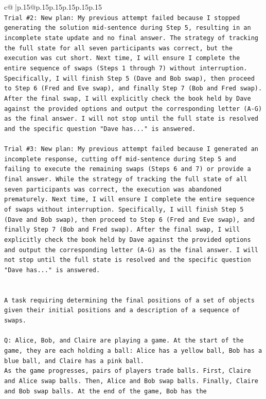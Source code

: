 \documentclass{article}
\begin{document}
{\begin{supertabular}{c@{$\;$}|p{.15\linewidth}@{}p{.15\linewidth}p{.15\linewidth}p{.15\linewidth}p{.15\linewidth}p{.15\linewidth}}
{{{\\ 
\texttt{Trial \#2: New plan: My previous attempt failed because I stopped generating the solution mid{-}sentence during Step 5, resulting in an incomplete state update and no final answer. The strategy of tracking the full state for all seven participants was correct, but the execution was cut short. Next time, I will ensure I complete the entire sequence of swaps (Steps 1 through 7) without interruption. Specifically, I will finish Step 5 (Dave and Bob swap), then proceed to Step 6 (Fred and Eve swap), and finally Step 7 (Bob and Fred swap). After the final swap, I will explicitly check the book held by Dave against the provided options and output the corresponding letter (A{-}G) as the final answer. I will not stop until the full state is resolved and the specific question "Dave has..." is answered.} \\
\\ 
\texttt{Trial \#3: New plan: My previous attempt failed because I generated an incomplete response, cutting off mid{-}sentence during Step 5 and failing to execute the remaining swaps (Steps 6 and 7) or provide a final answer. While the strategy of tracking the full state of all seven participants was correct, the execution was abandoned prematurely. Next time, I will ensure I complete the entire sequence of swaps without interruption. Specifically, I will finish Step 5 (Dave and Bob swap), then proceed to Step 6 (Fred and Eve swap), and finally Step 7 (Bob and Fred swap). After the final swap, I will explicitly check the book held by Dave against the provided options and output the corresponding letter (A{-}G) as the final answer. I will not stop until the full state is resolved and the specific question "Dave has..." is answered.} \\
\\ 
\\ 
\texttt{A task requiring determining the final positions of a set of objects given their initial positions and a description of a sequence of swaps.} \\
\\ 
\texttt{Q: Alice, Bob, and Claire are playing a game. At the start of the game, they are each holding a ball: Alice has a yellow ball, Bob has a blue ball, and Claire has a pink ball.} \\
\texttt{As the game progresses, pairs of players trade balls. First, Claire and Alice swap balls. Then, Alice and Bob swap balls. Finally, Claire and Bob swap balls. At the end of the game, Bob has the} \\
}}}
\end{supertabular}}
\end{document}
